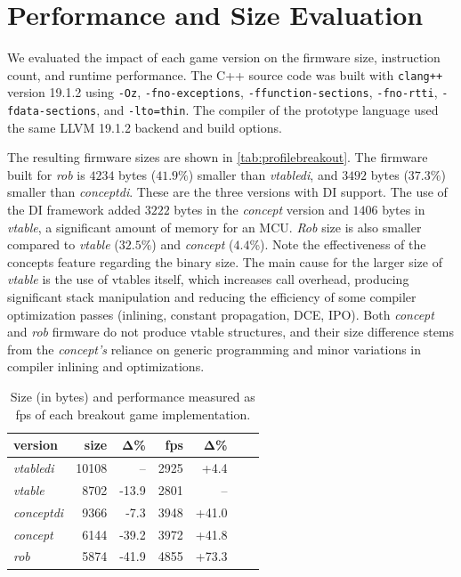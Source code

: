 \documentclass[10pt,sigplan,screen,anonymous]{acmart}
\begin{document}



\section{Performance and Size Evaluation} \label{sec:performance}

We evaluated the impact of each game version on the firmware size, instruction count, and runtime performance. The C++ source code was built with {\tt clang++} version 19.1.2 using {\tt -Oz}, {\tt -fno-exceptions}, {\tt -ffunction-sections}, {\tt -fno-rtti}, {\tt -fdata-sections}, and {\tt -lto=thin}. The compiler of the prototype language used the same LLVM 19.1.2 backend and build options. 

The resulting firmware sizes are shown in \autoref{tab:profilebreakout}. The firmware built for \emph{rob} is $4234$ bytes ($41.9\%$) smaller than \emph{vtabledi}, and $3492$ bytes ($37.3\%$) smaller than \emph{conceptdi}. These are the three versions with DI support. The use of the DI framework added $3222$ bytes in the \emph{concept} version and $1406$ bytes in \emph{vtable}, a significant amount of memory for an MCU. \emph{Rob} size is also smaller compared to \emph{vtable} ($32.5\%$) and \emph{concept} ($4.4$\%). Note the effectiveness of the concepts feature regarding the binary size. The main cause for the larger size of \emph{vtable} is the use of vtables itself, which increases call overhead, producing significant stack manipulation and reducing the efficiency of some compiler optimization passes (inlining, constant propagation, DCE, IPO). Both \emph{concept} and \emph{rob} firmware do not produce vtable structures, and their size difference stems from the \emph{concept's} reliance on generic programming and minor variations in compiler inlining and optimizations.


\begin{table}[bp]
\caption{Size (in bytes) and performance measured as fps of each breakout game implementation.}\vspace{-8pt}
\label{tab:profilebreakout}
\begin{tabular}{lrrrrrr}
\toprule
\bf version & \bf size & Δ\% & \bf fps & Δ\% \\
\midrule
\emph{vtabledi}   & 10108 & --     & 2925 & +4.4     \\
\emph{vtable}     & 8702  & -13.9  & 2801 & --   \\
\emph{conceptdi}  & 9366  & -7.3   & 3948 & +41.0  \\
\emph{concept}    & 6144  & -39.2  & 3972 & +41.8  \\
\emph{rob}        & 5874  & -41.9  & 4855 & +73.3  \\
\bottomrule
\end{tabular}
\end{table}
\end{document}
